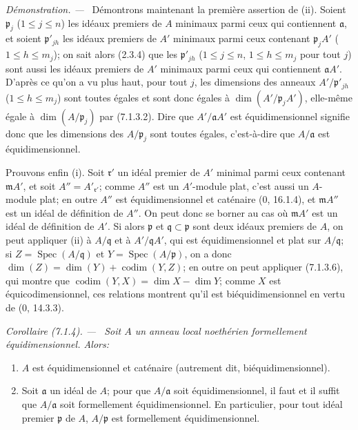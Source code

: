 \documentclass[10pt,oneside]{book}
\newenvironment{corollary}[1][]{%
  \par\medskip\noindent\itshape Corollaire (#1). ---\ }{\par}
\newenvironment{proof}{%
  \par\medskip\noindent\textit{Démonstration. ---\ }}{\par}
\begin{document}
\begin{proof}
Démontrons maintenant la première assertion de (ii). Soient $\mathfrak p_j$
($1\leqslant j\leqslant n$) les idéaux premiers de $A$ minimaux parmi ceux
qui contiennent $\mathfrak a$, et soient $\mathfrak p'_{jh}$ les idéaux
premiers de $A'$ minimaux parmi ceux contenant $\mathfrak p_jA'$
($1\leqslant h\leqslant m_j$); on sait alors (2.3.4) que les
$\mathfrak p'_{jh}$ ($1\leqslant j\leqslant n$, $1\leqslant h\leqslant
m_j$ pour tout $j$) sont aussi les idéaux premiers de $A'$ minimaux parmi
ceux qui contiennent $\mathfrak aA'$. D'après ce qu'on a vu plus haut, pour
tout $j$, les dimensions des anneaux $A'/\mathfrak p'_{jh}$
($1\leqslant h\leqslant m_j$) sont toutes égales et sont donc égales à
$\dim(A'/\mathfrak p_jA')$, elle-même égale à $\dim(A/\mathfrak p_j)$ par
(7.1.3.2). Dire que $A'/\mathfrak aA'$ est équidimensionnel signifie donc
que les dimensions des $A/\mathfrak p_j$ sont toutes égales, c'est-à-dire
que $A/\mathfrak a$ est équidimensionnel.

Prouvons enfin (i). Soit $\mathfrak r'$ un idéal premier de $A'$ minimal
parmi ceux contenant $\mathfrak mA'$, et soit $A''=A'_{\mathfrak r'}$;
comme $A''$ est un $A'$-module plat, c'est aussi un $A$-module plat; en
outre $A''$ est équidimensionnel et caténaire (0, 16.1.4), et
$\mathfrak mA''$ est un idéal de définition de $A''$. On peut donc se
borner au cas où $\mathfrak mA'$ est un idéal de définition de $A'$. Si
alors $\mathfrak p$ et $\mathfrak q\subset\mathfrak p$ sont deux idéaux
premiers de $A$, on peut appliquer (ii) à $A/\mathfrak q$ et à
$A'/\mathfrak qA'$, qui est équidimensionnel et plat sur
$A/\mathfrak q$; si $Z=\operatorname{Spec}(A/\mathfrak q)$ et
$Y=\operatorname{Spec}(A/\mathfrak p)$, on a donc
$\dim(Z)=\dim(Y)+\operatorname{codim}(Y,Z)$; en outre on peut appliquer
(7.1.3.6), qui montre que
$\operatorname{codim}(Y,X)=\dim X-\dim Y$; comme $X$ est
équicodimensionnel, ces relations montrent qu'il est biéquidimensionnel en
vertu de (0, 14.3.3).
\end{proof}

\begin{corollary}[7.1.4]
\label{IV.2.s7.1.4-fr}
Soit $A$ un anneau local noethérien formellement équidimensionnel. Alors:
\begin{enumerate}
\item[(i)] $A$ est équidimensionnel et caténaire (autrement dit,
biéquidimensionnel).
\item[(ii)] Soit $\mathfrak a$ un idéal de $A$; pour que $A/\mathfrak a$ soit
équidimensionnel, il faut et il suffit que $A/\mathfrak a$ soit formellement
équidimensionnel. En particulier, pour tout idéal premier $\mathfrak p$ de
$A$, $A/\mathfrak p$ est formellement équidimensionnel.
\end{enumerate}
\end{corollary}
\end{document}
